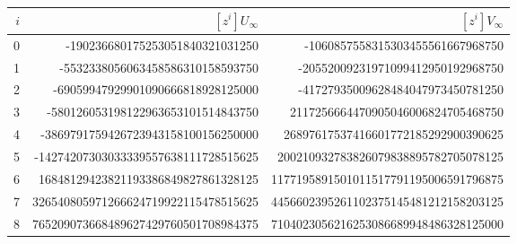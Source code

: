 \begin{center}
\scriptsize
\begin{tabular}{r|r r}
$i$ & $[z^i]U_\infty$ & $[z^i]V_\infty$\\\hline
0 & -190236680175253051840321031250 & -1060857558315303455561667968750\\
1 & -5532338056063458586310158593750 & -20552009231971099412950192968750\\
2 & -69059947929901090666818928125000 & -41727935009628484047973450781250\\
3 & -580126053198122963653101514843750 & 2117256664470905046006824705468750\\
4 & -3869791759426723943158100156250000 & 26897617537416601772185292900390625\\
5 & -14274207303033339557638111728515625 & 200210932783826079838895782705078125\\
6 & 16848129423821193386849827861328125 & 1177195891501011517791195006591796875\\
7 & 326540805971266624719922115478515625 & 4456602395261102375145481212158203125\\
8 & 765209073668489627429760501708984375 & 7104023056216253086689948486328125000\\
\end{tabular}
\end{center}
